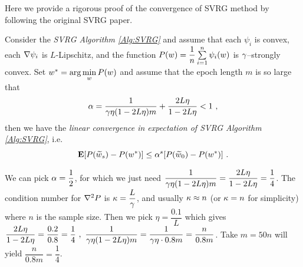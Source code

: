 Here we provide a rigorous proof of the convergence of SVRG method by following the original SVRG paper.

\begin{theorem}\label{Thm:ConvergenceSVRG}
Consider the \emph{SVRG Algorithm \ref{Alg:SVRG}} and assume that each $\psi_i$ is convex, each $\nabla \psi_i$ is $L$-Lipschitz, and the function
$P(w)=\dfrac{1}{n}\sum\limits_{i=1}^n \psi_i(w)$ is $\gamma$--strongly convex. Set $w^*=\arg\min\limits_{w}P(w)$
and assume that the epoch length $m$ is so large that
\begin{equation}\label{Thm:ConvergenceSVRG:Eq:AlphaCondition}
\al=\dfrac{1}{\gm\eta(1-2L\eta)m}+\dfrac{2L\eta}{1-2L\eta}<1 \ ,
\end{equation}
then we have the \emph{linear convergence in expectation of SVRG Algorithm \ref{Alg:SVRG}}, i.e.
\begin{equation}\label{Thm:ConvergenceSVRG:Eq:LinearConvergence}
\E [P(\widetilde{w}_s)- P(w^*)]\leq \al^s [P(\widetilde{w}_0)-P(w^*)] \ .
\end{equation}
\end{theorem}

\begin{remark}\label{Rmk:Thm:ConvergenceSVRG:ChoiceParameters}
\rm We can pick $\alpha=\dfrac{1}{2}$, for which we just need $\dfrac{1}{\gamma \eta (1-2L\eta)m}=\dfrac{2L\eta}{1-2L\eta}=\dfrac{1}{4}$. The condition number for $\nabla^2 P$ is $\kappa=\dfrac{L}{\gamma}$, and usually $\kappa\approx n$ (or $\kappa=n$ for simplicity) where $n$ is the sample size. Then we pick $\eta = \dfrac{0.1}{L}$ which gives 
$\dfrac{2L\eta}{1-2L\eta}=\dfrac{0.2}{0.8}=\dfrac{1}{4} \ , \ \dfrac{1}{\gamma \eta (1-2L\eta)m}=\dfrac{1}{\gamma \eta \cdot 0.8m}=\dfrac{n}{0.8m}$.
Take $m=50n$ will yield $\dfrac{n}{0.8m}=\dfrac{1}{4}$. 
\end{remark}

